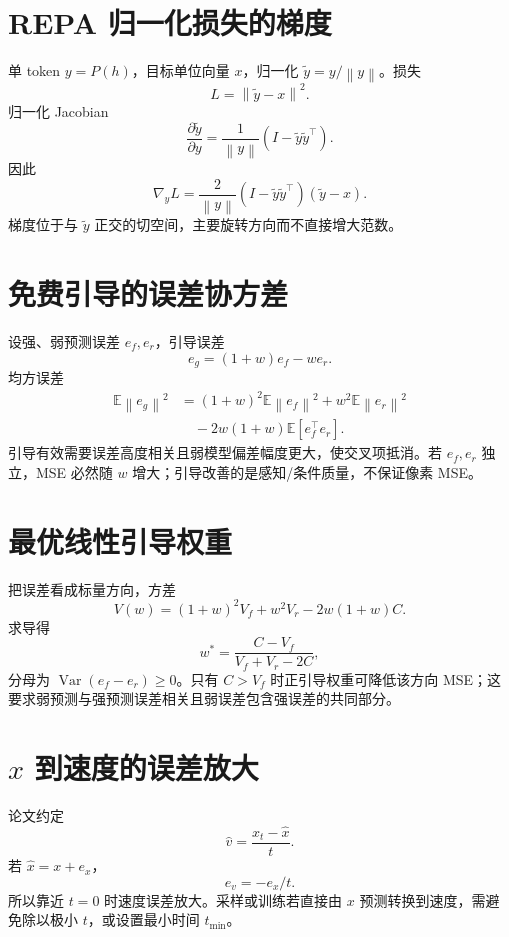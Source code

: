\documentclass[UTF8,12pt,a4paper,fontset=none]{ctexart}
\numberwithin{equation}{section}
\newcommand{\E}{\mathbb{E}}
\newcommand{\norm}[1]{\left\lVert #1\right\rVert}
\begin{document}
\section{REPA 归一化损失的梯度}
单 token $y=P(h)$，目标单位向量 $x$，归一化 $\widetilde y=y/\norm y$。损失
\begin{equation}
 L=\norm{\widetilde y-x}^2.
\end{equation}
归一化 Jacobian
\begin{equation}
 \frac{\partial\widetilde y}{\partial y}
 =\frac1{\norm y}(I-\widetilde y\widetilde y^\top).
\end{equation}
因此
\begin{equation}
 \nabla_yL=\frac2{\norm y}
 (I-\widetilde y\widetilde y^\top)(\widetilde y-x).
\end{equation}
梯度位于与 $\widetilde y$ 正交的切空间，主要旋转方向而不直接增大范数。

\section{免费引导的误差协方差}
设强、弱预测误差 $e_f,e_r$，引导误差
\begin{equation}
 e_g=(1+w)e_f-we_r.
\end{equation}
均方误差
\begin{align}
 \E\norm{e_g}^2
 &=(1+w)^2\E\norm{e_f}^2+w^2\E\norm{e_r}^2\\
 &\quad-2w(1+w)\E[e_f^\top e_r].
\end{align}
引导有效需要误差高度相关且弱模型偏差幅度更大，使交叉项抵消。若 $e_f,e_r$ 独立，MSE 必然随 $w$ 增大；引导改善的是感知/条件质量，不保证像素 MSE。

\section{最优线性引导权重}
把误差看成标量方向，方差
\begin{equation}
 V(w)=(1+w)^2V_f+w^2V_r-2w(1+w)C.
\end{equation}
求导得
\begin{equation}
 w^*=\frac{C-V_f}{V_f+V_r-2C},
\end{equation}
分母为 $\operatorname{Var}(e_f-e_r)\ge0$。只有 $C>V_f$ 时正引导权重可降低该方向 MSE；这要求弱预测与强预测误差相关且弱误差包含强误差的共同部分。

\section{$x$ 到速度的误差放大}
论文约定
\begin{equation}
 \widehat v=\frac{x_t-\widehat x}{t}.
\end{equation}
若 $\widehat x=x+e_x$，
\begin{equation}
 e_v=-e_x/t.
\end{equation}
所以靠近 $t=0$ 时速度误差放大。采样或训练若直接由 $x$ 预测转换到速度，需避免除以极小 $t$，或设置最小时间 $t_{\min}$。
\end{document}
